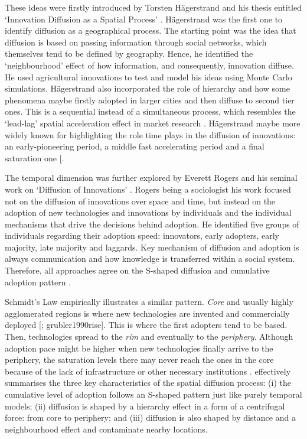 \documentclass[
  authoryear,
  preprint,
  3p]{elsarticle}
\begin{document}
These ideas were firstly introduced by Torsten Hägerstrand and his
thesis entitled `Innovation Diffusion as a Spatial Process'
\citep{hagerstrand1968innovation}. Hägerstrand was the first one to
identify diffusion as a geographical process. The starting point was the
idea that diffusion is based on passing information through social
networks, which themselves tend to be defined by geography. Hence, he
identified the `neighbourhood' effect of how information, and
consequently, innovation diffuse. He used agricultural innovations to
test and model his ideas using Monte Carlo simulations. Hägerstrand also
incorporated the role of hierarchy and how some phenomena maybe firstly
adopted in larger cities and then diffuse to second tier ones. This is a
sequential instead of a simultaneous process, which resembles the
`lead-lag' spatial acceleration effect in market research
\citep{bento2018time, PERES201091}. Hägerstrand maybe more widely known
for highlighting the role time plays in the diffusion of innovations: an
early-pioneering period, a middle fast accelerating period and a final
saturation one {[}\citet{morrill2020spatial}.

The temporal dimension was further explored by Everett Rogers and his
seminal work on `Diffusion of Innovations' \citep{rogers2010diffusion}.
Rogers being a sociologist his work focused not on the diffusion of
innovations over space and time, but instead on the adoption of new
technologies and innovations by individuals and the individual
mechanisms that drive the decisions behind adoption. He identified five
groups of individuals regarding their adoption speed: innovators, early
adopters, early majority, late majority and laggards. Key mechanism of
diffusion and adoption is always communication and how knowledge is
transferred within a social system. Therefore, all approaches agree on
the S-shaped diffusion and cumulative adoption pattern
\citep{grubler1990rise}.

Schmidt's Law empirically illustrates a similar pattern. \emph{Core} and
usually highly agglomerated regions is where new technologies are
invented and commercially deployed {[}\citet{grubler1990rise};
grubler1990rise{]}. This is where the first adopters tend to be based.
Then, technologies spread to the \emph{rim} and eventually to the
\emph{periphery}. Although adoption pace might be higher when new
technologies finally arrive to the periphery, the saturation levels
there may never reach the ones in the core because of the lack of
infrastructure or other necessary institutions
\citep{leibowicz2016representing}. \citet{grubler1990rise} effectively
summarises the three key characteristics of the spatial diffusion
process: (i) the cumulative level of adoption follows an S-shaped
pattern just like purely temporal models; (ii) diffusion is shaped by a
hierarchy effect in a form of a centrifugal force: from core to
periphery; and (iii) diffusion is also shaped by distance and a
neighbourhood effect and contaminate nearby locations.
\end{document}
